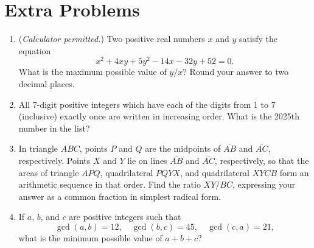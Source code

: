 \documentclass{article}
\begin{document}
\newpage

\section*{Extra Problems}

\begin{enumerate}
\item (\emph{Calculator permitted.}) Two positive real numbers $x$ and $y$ satisfy the equation
\begin{equation*}
x^2 + 4xy + 5y^2 - 14x - 32y + 52 = 0.
\end{equation*}
What is the maximum possible value of $y/x$? Round your answer to two decimal places.\vspace{3cm}
\item All 7-digit positive integers which have each of the digits from 1 to 7 (inclusive) exactly once are written in increasing order. What is the 2025th number in the list?\vspace{3cm}
\item In triangle $ABC$, points $P$ and $Q$ are the midpoints of $\overline{AB}$ and $\overline{AC}$, respectively. Points $X$ and $Y$ lie on lines $\overline{AB}$ and $\overline{AC}$, respectively, so that the areas of triangle $APQ$, quadrilateral $PQYX$, and quadrilateral $XYCB$ form an arithmetic sequence in that order. Find the ratio $XY/BC$, expressing your answer as a common fraction in simplest radical form.\vspace{3cm}
\item If $a$, $b$, and $c$ are positive integers such that
\begin{equation*}
\gcd(a,b) = 12,\quad\gcd(b,c) = 45,\quad\gcd(c,a) = 21,
\end{equation*}
what is the minimum possible value of $a + b + c$?
\end{enumerate}
\end{document}
